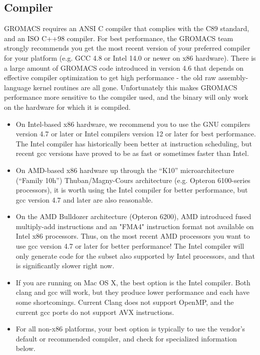 \documentclass{article}[12pt,a4paper,twoside]
\newcommand{\gromacs}{GROMACS}
\newcommand{\avx}{AVX}
\begin{document}
\subsection{Compiler}

\gromacs{} requires an ANSI C compiler that complies with the C89
standard, and an ISO C++98 compiler. For best performance, the
\gromacs{} team strongly recommends you get the most recent version of
your preferred compiler for your platform (e.g. GCC 4.8 or Intel 14.0
or newer on x86 hardware). There is a large amount of \gromacs{} code
introduced in version 4.6 that depends on effective compiler
optimization to get high performance - the old raw assembly-language
kernel routines are all gone.  Unfortunately this makes \gromacs{} performance
more sensitive to the compiler used, and the binary will only work on
the hardware for which it is compiled.

\begin{itemize}
\item On Intel-based x86 hardware, we recommend you to use
the GNU compilers version 4.7 or later or Intel compilers version 12 or later
for best performance. The Intel compiler has historically been better at
instruction scheduling, but recent gcc versions have proved to be as fast or
sometimes faster than Intel.
\item On AMD-based x86 hardware up through the ``K10'' microarchitecture (``Family 10h'')
Thuban/Magny-Cours architecture (e.g. Opteron 6100-series processors), it is worth using the Intel compiler for
better performance, but gcc version 4.7 and later are also reasonable.
\item On the AMD Bulldozer architecture (Opteron 6200), AMD introduced fused multiply-add
instructions and an "FMA4" instruction format not available on Intel x86 processors. Thus,
on the most recent AMD processors you want to use gcc version 4.7 or later for better performance!
The Intel compiler will only generate code for the subset also supported by Intel processors, and that
is significantly slower right now.
\item If you are running on Mac OS X, the best option is the Intel compiler.
Both clang and gcc will work, but they produce lower performance and each have some
shortcomings. Current Clang does not support OpenMP, and the current gcc ports do not
support \avx{} instructions.
\item For all non-x86 platforms, your best option is typically to use the vendor's 
default or recommended compiler, and check for specialized information below.
\end{itemize}
\end{document}
